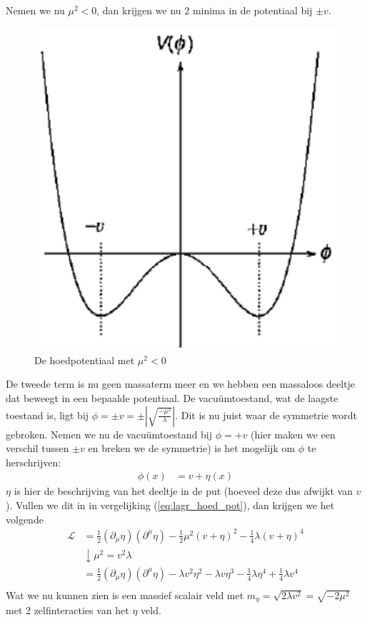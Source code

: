 \documentclass[../main.tex]{subfiles}
\begin{document}
Nemen we nu $\mu^2<0$, dan krijgen we nu 2 minima in de potentiaal bij $\pm v$.

\begin{figure}[h]
    \centering
    \includegraphics[width=0.2\linewidth]{higgs_boson/hoed_pot_2.png}
    \caption{De hoedpotentiaal met $\mu^2<0$}%
    \label{fig:higgs_boson/hoed_pot_2}
\end{figure}

De tweede term is nu geen massaterm meer en we hebben een massaloos deeltje dat beweegt in een bepaalde potentiaal. De vacuümtoestand, wat de laagste toestand is, ligt bij $\phi = \pm v = \pm \left| \sqrt{ \frac{-\mu^2}{\lambda}} \right|$. Dit is nu juist waar de symmetrie wordt gebroken. Nemen we nu de vacuümtoestand bij $\phi = +v$ (hier maken we een verschil tussen $\pm v$ en breken we de symmetrie) is het mogelijk om $\phi$ te herschrijven:
\begin{equation}
    \begin{aligned}
        \label{eq:veld_symm_breking}
        \phi(x) &= v+\eta(x)
    \end{aligned}
\end{equation}
$\eta$ is hier de beschrijving van het deeltje in de put (hoeveel deze dus afwijkt van $v$). Vullen we dit in in vergelijking (\ref{eq:lagr_hoed_pot}), dan krijgen we het volgende
\begin{equation}
    \begin{aligned}
        \label{eq:lagr_hoed_pot_symm_breking}
        \mathcal{L} &= \frac{1}{2} (\partial_\mu \eta) (\partial^\mu \eta) - \frac{1}{2} \mu^2 (v+\eta)^2 - \frac{1}{4} \lambda (v+\eta)^4\\
                    &\downarrow \mu^2= v^2\lambda\\
        &= \frac{1}{2} (\partial_\mu \eta) (\partial^\mu \eta) - \lambda v^2\eta^2 - \lambda v \eta^3 - \frac{1}{4} \lambda \eta^4 + \frac{1}{4} \lambda v^4\\
    \end{aligned}
\end{equation}
Wat we nu kunnen zien is een massief scalair veld met $m_\eta = \sqrt{2\lambda v^2} = \sqrt{-2\mu^2}$ met 2 zelfinteracties van het $\eta$ veld.
\end{document}
